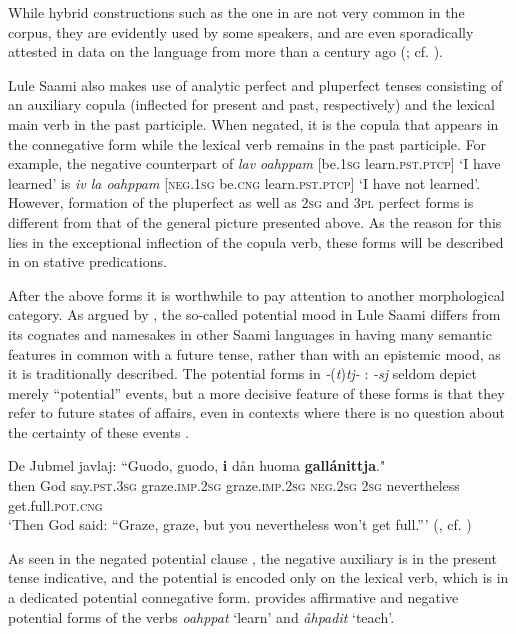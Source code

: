 \documentclass[output=paper,colorlinks,citecolor=brown]{langscibook}
\begin{document}
While hybrid constructions such as the one in  are not very common in the corpus, they are evidently used by some speakers, and are even sporadically attested in data on the language from more than a century ago (\citealt{KejonenFC}; cf. \citealt[273]{Wiklund1891}).

Lule Saami also makes use of analytic perfect and pluperfect tenses consisting of an auxiliary copula (inflected for present and past, respectively) and the lexical main verb in the past participle. When negated, it is the copula that appears in the connegative form while the lexical verb remains in the past participle. For example, the negative counterpart of \textit{lav oahppam} [be.\textsc{1sg} learn.\textsc{pst.ptcp}] ‘I have learned’ is \textit{iv la oahppam} [\textsc{neg}.\textsc{1sg} be.\textsc{cng} learn.\textsc{pst.ptcp}] ‘I have not learned’. However, formation of the pluperfect as well as \textsc{2sg} and \textsc{3pl} perfect forms is different from that of the general picture presented above. As the reason for this lies in the exceptional inflection of the copula verb, these forms will be described in  on stative predications.

After the above forms it is worthwhile to pay attention to another morphological category. As argued by \citet{Ylikoski2016b}, the so-called potential mood in Lule Saami differs from its cognates and namesakes in other Saami languages in having many semantic features in common with a future tense, rather than with an epistemic mood, as it is traditionally described. The potential forms in \textit{{}-}(\textit{t})\textit{tj{}-} : \textit{{}-sj} seldom depict merely “potential” events, but a more decisive feature of these forms is that they refer to future states of affairs, even in contexts where there is no question about the certainty of these events .

\ea\label{ex:lul:9} 
    \gll De Jubmel javlaj: “Guodo, guodo, \textbf{i} dån huoma \textbf{gallánittja}."\\ 
         then God say.\textsc{pst.3sg} graze.\textsc{imp.2sg} graze.\textsc{imp.2sg} \textsc{neg.2sg} \textsc{2sg} nevertheless get.full.\textsc{pot.cng}\\
    \glt ‘Then God said: “Graze, graze, but you nevertheless won’t get full.”’ (\citealt{SIKOR2021}, cf. \citealt[141]{Grundstrom1926})
\z 

As seen in the negated potential clause , the negative auxiliary is in the present tense indicative, and the potential is encoded only on the lexical verb, which is in a dedicated potential connegative form.  provides affirmative and negative potential forms of the verbs \textit{oahppat} ‘learn’ and \textit{åhpadit} ‘teach’.
\end{document}
